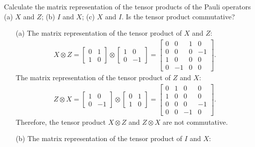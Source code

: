 \documentclass[en]{sol-man}
\begin{document}
\begin{exe}
    Calculate the matrix representation of the tensor products of the Pauli operators (a) $X$ and $Z$; (b) $I$ and $X$; (c) $X$ and $I$. Is the tensor product commutative?
\end{exe}
\begin{sol}
    \begin{itemize}
        \item[(a)] The matrix representation of the tensor product of $X$ and $Z$:
        \begin{align}
            X\otimes Z=\left[\begin{matrix}
                0&1\\
                1&0
            \end{matrix}\right]\otimes\left[\begin{matrix}
                1&0\\
                0&-1
            \end{matrix}\right]=\left[\begin{matrix}
                0&0&1&0\\
                0&0&0&-1\\
                1&0&0&0\\
                0&-1&0&0
            \end{matrix}\right].
        \end{align}
        The matrix representation of the tensor product of $Z$ and $X$:
        \begin{align}
            Z\otimes X=\left[\begin{matrix}
                1&0\\
                0&-1
            \end{matrix}\right]\otimes\left[\begin{matrix}
                0&1\\
                1&0
            \end{matrix}\right]=\left[\begin{matrix}
                0&1&0&0\\
                1&0&0&0\\
                0&0&0&-1\\
                0&0&-1&0
            \end{matrix}\right].
        \end{align}
        Therefore, the tensor product $X\otimes Z$ and $Z\otimes X$ are not commutative.
        \item[(b)] The matrix representation of the tensor product of $I$ and $X$:

\end{itemize}
\end{sol}
\end{document}
